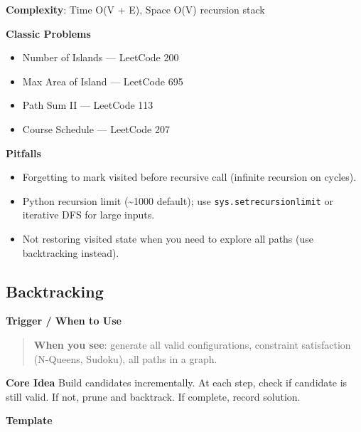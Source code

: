 \documentclass[11pt]{article}
\providecommand{\tightlist}{\setlength{\itemsep}{1pt}\setlength{\parskip}{0pt}}
\begin{document}
\textbf{Complexity}: Time O(V + E), Space O(V) recursion stack

\textbf{Classic Problems}

\begin{itemize}
\tightlist
\item
  Number of Islands --- LeetCode 200
\item
  Max Area of Island --- LeetCode 695
\item
  Path Sum II --- LeetCode 113
\item
  Course Schedule --- LeetCode 207
\end{itemize}

\textbf{Pitfalls}

\begin{itemize}
\tightlist
\item
  Forgetting to mark visited before recursive call (infinite recursion on cycles).
\item
  Python recursion limit (\textasciitilde1000 default); use \texttt{sys.setrecursionlimit} or iterative DFS for large inputs.
\item
  Not restoring visited state when you need to explore all paths (use backtracking instead).
\end{itemize}

\subsection{Backtracking}\label{backtracking}

\textbf{Trigger / When to Use}

\begin{quote}
\textbf{When you see}: generate all valid configurations, constraint satisfaction (N-Queens, Sudoku), all paths in a graph.
\end{quote}

\textbf{Core Idea}
Build candidates incrementally. At each step, check if candidate is still valid. If not, prune and backtrack. If complete, record solution.

\textbf{Template}

\end{document}
